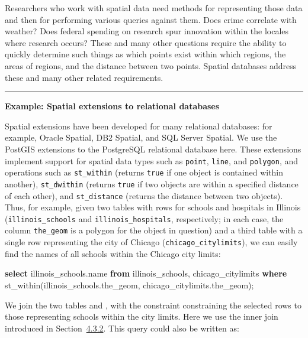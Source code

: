 \documentclass[]{krantz}
\newenvironment{Shaded}{\begin{snugshade}}{\end{snugshade}}
\newcommand{\KeywordTok}[1]{\textcolor[rgb]{0.13,0.29,0.53}{\textbf{#1}}}
\newcommand{\NormalTok}[1]{#1}
\begin{document}
Researchers who work with spatial data need methods for representing
those data and then for performing various queries against them. Does
crime correlate with weather? Does federal spending on research spur
innovation within the locales where research occurs? These and many
other questions require the ability to quickly determine such things as
which points exist within which regions, the areas of regions, and the
distance between two points. Spatial databases address these and many
other related requirements.

\begin{center}\rule{0.5\linewidth}{\linethickness}\end{center}

\textbf{Example: Spatial extensions to relational databases}

Spatial extensions have been developed for many relational databases:
for example, Oracle Spatial, DB2 Spatial, and SQL Server Spatial. We use
the PostGIS extensions to the PostgreSQL relational database here. These
extensions implement support for spatial data types such as
\texttt{point}, \texttt{line}, and \texttt{polygon}, and operations such
as \texttt{st\_within} (returns \texttt{true} if one object is contained
within another), \texttt{st\_dwithin} (returns \texttt{true} if two
objects are within a specified distance of each other), and
\texttt{st\_distance} (returns the distance between two objects). Thus,
for example, given two tables with rows for schools and hospitals in
Illinois (\texttt{illinois\_schools} and \texttt{illinois\_hospitals},
respectively; in each case, the column \texttt{the\_geom} is a polygon
for the object in question) and a third table with a single row
representing the city of Chicago (\texttt{chicago\_citylimits}), we can
easily find the names of all schools within the Chicago city limits:

\begin{Shaded}
\begin{Highlighting}[]
\KeywordTok{select}\NormalTok{ illinois_schools.name}
  \KeywordTok{from}\NormalTok{ illinois_schools, chicago_citylimits}
  \KeywordTok{where}\NormalTok{ st_within(illinois_schools.the_geom,}
\NormalTok{                  chicago_citylimits.the_geom);}
\end{Highlighting}
\end{Shaded}

We join the two tables and , with the constraint constraining the
selected rows to those representing schools within the city limits. Here
we use the inner join introduced in
Section~\protect\hyperlink{sec:db:sql}{4.3.2}. This query could also be
written as:
\end{document}

